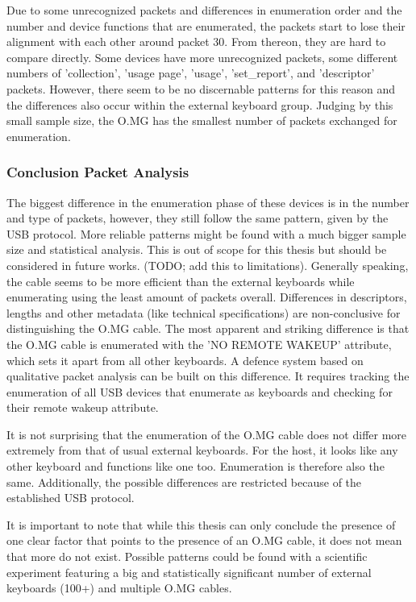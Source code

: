Due to some unrecognized packets and differences in enumeration order and the number and device functions that are enumerated, the packets start to lose their alignment with each other around packet 30. From thereon, they are hard to compare directly. Some devices have more unrecognized packets, some different numbers of 'collection', 'usage page', 'usage', 'set\_report', and 'descriptor' packets. However, there seem to be no discernable patterns for this reason and the differences also occur within the external keyboard group. Judging by this small sample size, the O.MG has the smallest number of packets exchanged for enumeration. 


\subsubsection{Conclusion Packet Analysis}

The biggest difference in the enumeration phase of these devices is in the number and type of packets, however, they still follow the same pattern, given by the USB protocol. More reliable patterns might be found with a much bigger sample size and statistical analysis. This is out of scope for this thesis but should be considered in future works. (TODO; add this to limitations). Generally speaking, the cable seems to be more efficient than the external keyboards while enumerating using the least amount of packets overall.
Differences in descriptors, lengths and other metadata (like technical specifications) are non-conclusive for distinguishing the O.MG cable. 
The most apparent and striking difference is that the O.MG cable is enumerated with the 'NO REMOTE WAKEUP' attribute, which sets it apart from all other keyboards.
A defence system based on qualitative packet analysis can be built on this difference. It requires tracking the enumeration of all USB devices that enumerate as keyboards and checking for their remote wakeup attribute. 

It is not surprising that the enumeration of the O.MG cable does not differ more extremely from that of usual external keyboards. For the host, it looks like any other keyboard and functions like one too. Enumeration is therefore also the same. Additionally, the possible differences are restricted because of the established USB protocol.

It is important to note that while this thesis can only conclude the presence of one clear factor that points to the presence of an O.MG cable, it does not mean that more do not exist. Possible patterns could be found with a scientific experiment featuring a big and statistically significant number of external keyboards (100+) and multiple O.MG cables.

